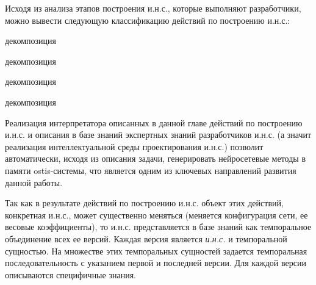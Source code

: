 Исходя из анализа этапов построения и.н.с., которые выполняют разработчики, можно вывести следующую классификацию действий по построению и.н.с.:

\begin{SCn}
	\begin{scnrelfromset}{декомпозиция}
		\begin{scnrelfromset}{декомпозиция}
		\end{scnrelfromset}

		\begin{scnrelfromset}{декомпозиция}
		\end{scnrelfromset}

		\begin{scnrelfromset}{декомпозиция}
		\end{scnrelfromset}
	\end{scnrelfromset}
\end{SCn}

Реализация интерпретатора описанных в данной главе действий по построению и.н.с. и описания в базе знаний экспертных знаний разработчиков и.н.с. (а значит реализация интеллектуальной среды проектирования и.н.с.) позволит автоматически, исходя из описания задачи, генерировать нейросетевые методы в памяти ostis-системы, что является одним из ключевых направлений развития данной работы.

Так как в результате действий по построению и.н.с. объект этих действий, конкретная и.н.с., может существенно меняться (меняется конфигурация сети, ее весовые коэффициенты), то и.н.с. представляется в базе знаний как темпоральное объединение всех ее версий. Каждая версия является  \textit{и.н.с.} и темпоральной сущностью. На множестве этих темпоральных сущностей задается темпоральная последовательность с указанием первой и последней версии. Для каждой версии описываются специфичные знания.

